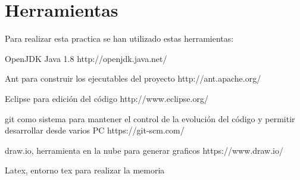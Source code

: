 \chapter{Herramientas}

Para realizar esta practica se han utilizado estas herramientas:
\begin{compactitem}
	\item OpenJDK Java 1.8 http://openjdk.java.net/
	\item Ant para construir los ejecutables del proyecto http://ant.apache.org/
	\item Eclipse para edición del código http://www.eclipse.org/
	\item git como sistema para mantener el control de la evolución del código y permitir desarrollar desde varios PC https://git-scm.com/
	\item draw.io, herramienta en la nube para generar graficos https://www.draw.io/
	\item Latex, entorno tex para realizar la memoria
\end{compactitem}
